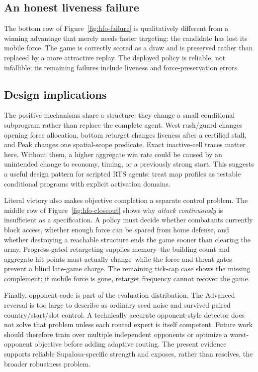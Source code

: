 \subsection{An honest liveness failure}

The bottom row of Figure~\ref{fig:hfo-failure} is qualitatively different from
a winning advantage that merely needs faster targeting: the candidate has lost
its mobile force. The game is correctly scored as a draw and is preserved
rather than replaced by a more attractive replay. The deployed policy is
reliable, not infallible; its remaining failures include liveness and
force-preservation errors.

\subsection{Design implications}

The positive mechanisms share a structure: they change a small conditional
subprogram rather than replace the complete agent. West rush/guard changes
opening force allocation, bottom retarget changes liveness after a certified
stall, and Peak changes one spatial-scope predicate. Exact inactive-cell traces
matter here. Without them, a higher aggregate win rate could be caused by an
unintended change to economy, timing, or a previously strong start. This
suggests a useful design pattern for scripted RTS agents: treat map profiles as
testable conditional programs with explicit activation domains.

Literal victory also makes objective completion a separate control problem.
The middle row of Figure~\ref{fig:hfo-closeout} shows why
\emph{attack continuously} is insufficient as a specification. A policy must
decide whether combatants currently block access, whether enough force can be
spared from home defense, and whether destroying a reachable structure ends
the game sooner than clearing the army. Progress-gated retargeting supplies
memory--the building count and aggregate hit points must actually change--while
the force and threat gates prevent a blind late-game charge. The remaining
tick-cap case shows the missing complement: if mobile force is gone, retarget
frequency cannot recover the game.

Finally, opponent code is part of the evaluation distribution. The Advanced
reversal is too large to describe as ordinary seed noise and survived paired
country/start/slot control. A technically accurate opponent-style detector does
not solve that problem unless each routed expert is itself competent. Future
work should therefore train over multiple independent opponents or optimize a
worst-opponent objective before adding adaptive routing. The present evidence
supports reliable Supalosa-specific strength and exposes, rather than resolves,
the broader robustness problem.

\FloatBarrier
